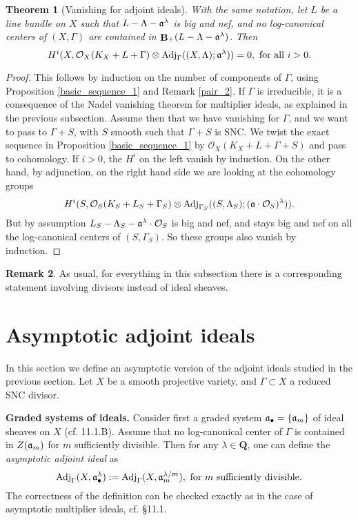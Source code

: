 \documentclass[11pt]{amsart}
\theoremstyle{plain}
\newtheorem{theorem}{Theorem}[section]
\theoremstyle{definition}
\newtheorem{remark}[theorem]{Remark}
\newcommand{\QQ}{\mathbf{Q}}
\newcommand{\OO}{\mathcal  {O}}
\newcommand{\fra}{\frak{a}}
\newcommand{\Adj}{{\rm Adj}}
\DeclareMathOperator{\BB}{{\bf B}}
\begin{document}
\begin{theorem}[Vanishing for adjoint ideals]\label{adjoint_nadel}
With the same notation, let $L$ be a line bundle on $X$ such that $L- \Lambda -\fra^{\lambda}$ is big and nef, and no log-canonical centers of 
$(X, \Gamma)$ are contained in $\BB_{+} (L - \Lambda - \fra^{\lambda})$. Then 
$$H^i (X, \OO_X(K_X + L + \Gamma)\otimes \Adj_{\Gamma}  ((X, \Lambda); \fra^{\lambda})) = 0, 
{\rm~for~all~} i>0.$$
\end{theorem}
\begin{proof}
This follows by induction on the number of components of $\Gamma$, using Proposition \ref{basic_sequence_1} and Remark \ref{pair_2}. If $\Gamma$ is irreducible, it is a consequence of the Nadel vanishing theorem for multiplier ideals, as explained in the 
previous subsection. Assume then that we have vanishing for $\Gamma$, and we want to pass to $\Gamma + S$, with $S$ smooth such that $\Gamma + S$ is SNC. We twist the exact sequence in Proposition \ref{basic_sequence_1} by $\OO_X(K_X + L + \Gamma + S)$ and pass to cohomology. If $i > 0$, the $H^i$ on the left vanish by induction. On the 
other hand, by adjunction, on the right hand side we are looking at the cohomology groups
$$H^i (S, \OO_S (K_S + L_S + \Gamma_S) \otimes \Adj_{\Gamma_S}  ((S, \Lambda_S); (\fra\cdot \OO_S)^{\lambda}) ).$$ 
But by assumption $L_S - \Lambda_S - \fra^{\lambda}\cdot \OO_S$ is big and nef, and stays big and nef on all the log-canonical centers of $(S, \Gamma_S)$. So these groups also vanish by induction.  
\end{proof}

\begin{remark}
As usual, for everything in this subsection there is a corresponding statement involving 
divisors instead of ideal sheaves. 
\end{remark}




\section{Asymptotic adjoint ideals}

In this section we define an asymptotic version of the adjoint ideals studied in the previous section. Let $X$ be a smooth projective variety, and $\Gamma\subset X$ a reduced SNC divisor. 

\noindent
{\bf Graded systems of ideals.} Consider first a graded system $\fra_{\bullet} = \{\fra_m\}$ of ideal sheaves on $X$ (cf. \cite{positivity} 11.1.B). Assume that  no log-canonical center of $\Gamma$ is contained in $Z(\fra_m)$ for $m$ sufficiently divisible. Then for any $\lambda \in \QQ$, one can define the \emph{asymptotic adjoint ideal} as
$$\Adj_{\Gamma} (X, \fra_{\bullet}^{\lambda}) := \Adj_{\Gamma} (X, \fra_{m}^{\lambda/m}), 
~{\rm for~} m {\rm~sufficiently~divisible}.$$
The correctness of the definition can be checked exactly as in the case of asymptotic multiplier ideals, cf. \cite{positivity} \S11.1.
\end{document}
